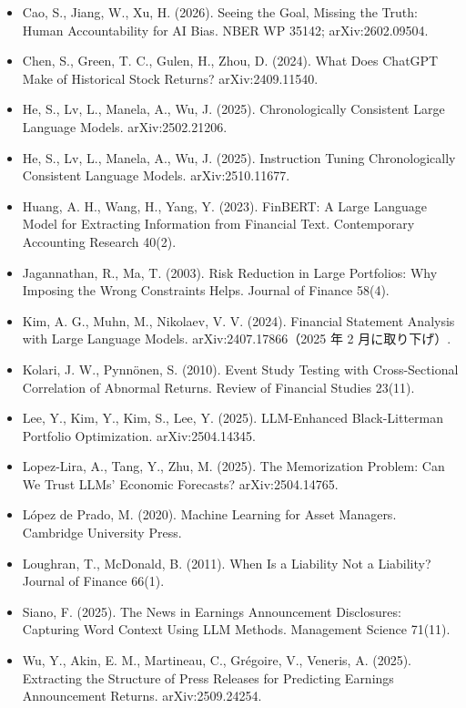 \documentclass[xelatex,ja=standard,jafont=haranoaji,a4paper,10pt]{bxjsreport}
\begin{document}
\begin{itemize}\small
\item Cao, S., Jiang, W., Xu, H. (2026). Seeing the Goal, Missing the Truth: Human Accountability for AI Bias. NBER WP 35142; arXiv:2602.09504.
\item Chen, S., Green, T. C., Gulen, H., Zhou, D. (2024). What Does ChatGPT Make of Historical Stock Returns? arXiv:2409.11540.
\item He, S., Lv, L., Manela, A., Wu, J. (2025). Chronologically Consistent Large Language Models. arXiv:2502.21206.
\item He, S., Lv, L., Manela, A., Wu, J. (2025). Instruction Tuning Chronologically Consistent Language Models. arXiv:2510.11677.
\item Huang, A. H., Wang, H., Yang, Y. (2023). FinBERT: A Large Language Model for Extracting Information from Financial Text. Contemporary Accounting Research 40(2).
\item Jagannathan, R., Ma, T. (2003). Risk Reduction in Large Portfolios: Why Imposing the Wrong Constraints Helps. Journal of Finance 58(4).
\item Kim, A. G., Muhn, M., Nikolaev, V. V. (2024). Financial Statement Analysis with Large Language Models. arXiv:2407.17866（2025 年 2 月に取り下げ）.
\item Kolari, J. W., Pynnönen, S. (2010). Event Study Testing with Cross-Sectional Correlation of Abnormal Returns. Review of Financial Studies 23(11).
\item Lee, Y., Kim, Y., Kim, S., Lee, Y. (2025). LLM-Enhanced Black-Litterman Portfolio Optimization. arXiv:2504.14345.
\item Lopez-Lira, A., Tang, Y., Zhu, M. (2025). The Memorization Problem: Can We Trust LLMs' Economic Forecasts? arXiv:2504.14765.
\item López de Prado, M. (2020). Machine Learning for Asset Managers. Cambridge University Press.
\item Loughran, T., McDonald, B. (2011). When Is a Liability Not a Liability? Journal of Finance 66(1).
\item Siano, F. (2025). The News in Earnings Announcement Disclosures: Capturing Word Context Using LLM Methods. Management Science 71(11).
\item Wu, Y., Akin, E. M., Martineau, C., Grégoire, V., Veneris, A. (2025). Extracting the Structure of Press Releases for Predicting Earnings Announcement Returns. arXiv:2509.24254.
\end{itemize}
\end{document}
